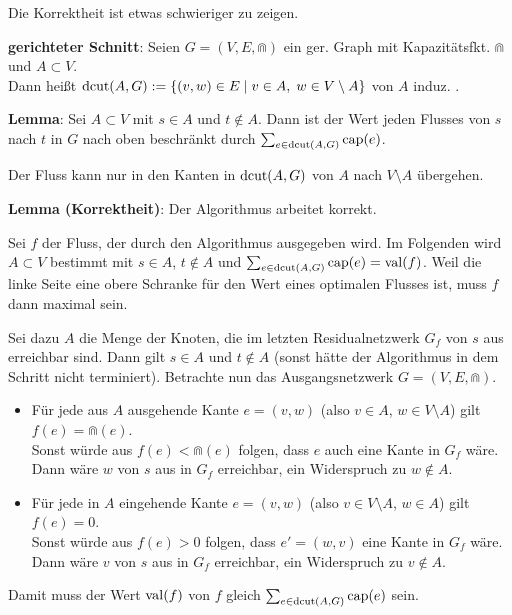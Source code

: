 Die Korrektheit ist etwas schwieriger zu zeigen.

\textbf{gerichteter Schnitt}:
Seien $G = (V, E, \Cap)$ ein ger. Graph mit Kapazitätsfkt. $\Cap$ und $A \subset V$.\\
Dann heißt $\operatorname{dcut}(A, G) := \{(v, w) \in E \;|\; v \in A,\; w \in V \setminus A\}$
von $A$ induz. .

\textbf{Lemma}:
Sei $A \subset V$ mit $s \in A$ und $t \notin A$.
Dann ist der Wert jeden Flusses von $s$ nach $t$ in $G$ nach oben beschränkt durch
$\sum_{e \in \operatorname{dcut}(A, G)} \operatorname{cap}(e)$.

\begin{Beweis}
    Der Fluss kann nur in den Kanten in $\operatorname{dcut}(A, G)$ von $A$ nach $V \setminus A$
    übergehen.
\end{Beweis}

\textbf{Lemma (Korrektheit)}:
Der Algorithmus arbeitet korrekt.

\begin{Beweis}
    Sei $f$ der Fluss, der durch den Algorithmus ausgegeben wird.
    Im Folgenden wird $A \subset V$ bestimmt mit $s \in A$, $t \notin A$ und
    $\sum_{e \in \operatorname{dcut}(A, G)} \operatorname{cap}(e) = \operatorname{val}(f)$.
    Weil die linke Seite eine obere Schranke für den Wert eines optimalen Flusses ist,
    muss $f$ dann maximal sein.

    Sei dazu $A$ die Menge der Knoten, die im letzten Residualnetzwerk $G_f$ von $s$ aus
    erreichbar sind.
    Dann gilt $s \in A$ und $t \notin A$
    (sonst hätte der Algorithmus in dem Schritt nicht terminiert).
    Betrachte nun das Ausgangsnetzwerk $G = (V, E, \Cap)$.
    \begin{itemize}
        \item
        Für jede aus $A$ ausgehende Kante $e = (v, w)$ (also $v \in A$, $w \in V \setminus A$)
        gilt $f(e) = \Cap(e)$.\\
        Sonst würde aus $f(e) < \Cap(e)$ folgen, dass $e$ auch eine Kante in $G_f$ wäre.
        Dann wäre $w$ von $s$ aus in $G_f$ erreichbar, ein Widerspruch zu $w \notin A$.

        \item
        Für jede in $A$ eingehende Kante $e = (v, w)$ (also $v \in V \setminus A$, $w \in A$)
        gilt $f(e) = 0$.\\
        Sonst würde aus $f(e) > 0$ folgen, dass $e' = (w, v)$ eine Kante in $G_f$ wäre.
        Dann wäre $v$ von $s$ aus in $G_f$ erreichbar, ein Widerspruch zu $v \notin A$.
    \end{itemize}
    Damit muss der Wert $\operatorname{val}(f)$ von $f$ gleich $\sum_{e \in \operatorname{dcut}(A, G)} \operatorname{cap}(e)$ sein.
\end{Beweis}

